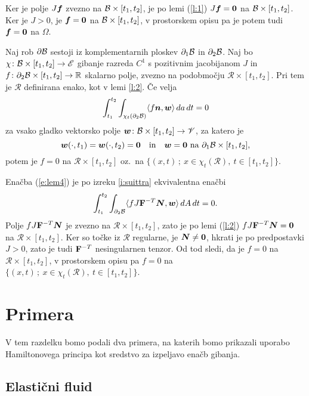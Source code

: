 	Ker je polje $J\boldsymbol f$ zvezno na $\mathcal B\times[t_1,t_2]$, je
	po lemi (\ref{l:1}) $J\boldsymbol f=\boldsymbol 0$
	na $\mathcal B\times[t_1,t_2]$. Ker je $J>0$, je $\boldsymbol f=\boldsymbol 0$ na $\mathcal B\times[t_1,t_2]$,
	v prostorskem opisu pa je potem tudi $\boldsymbol f=\boldsymbol 0$ na $\Omega$.
\endproof

\begin{lema} \label{lema4}
	Naj rob $\partial \mathcal B$ sestoji iz komplementarnih ploskev $\partial_1 \mathcal B$ in $\partial_2 \mathcal B$.
	Naj bo $\chi\colon \mathcal B\times[t_1,t_2]\to\mathscr E$ gibanje razreda $C^1$ s pozitivnim jacobijanom $J$ in
	$f\colon\partial_2 \mathcal B\times[t_1,t_2]\to\mathbb R$ skalarno polje, zvezno na podobmočju $\mathcal{R}\times[t_1,t_2]$.
	Pri tem je $\mathcal{R}$ definirana enako, kot v lemi \ref{l:2}. Če velja
	\begin{equation}\label{e:lem4}
		\int_{t_1}^{t_2}\int_{\chi_t(\partial_2 \mathcal B)}\langle f\boldsymbol n,\boldsymbol w\rangle\,da\,dt=0
	\end{equation}
	za vsako gladko vektorsko polje $\boldsymbol w\colon \mathcal B\times[t_1,t_2]\to\mathscr V$, za katero je
	\[
		\boldsymbol w(\cdot,t_1)=\boldsymbol w(\cdot,t_2)=\boldsymbol 0\quad\textrm{in}
		\quad\boldsymbol w=\boldsymbol 0\ \textrm{na}\ \partial_1 \mathcal B\times[t_1,t_2],
	\]
	potem je $f=0$ na $\mathcal{R}\times[t_1,t_2]$ oz.~na $\{(x,t)\,;\ x\in\chi_t(\mathcal{R}),\ t\in[t_1,t_2] \}$.
\end{lema}

\proof
	Enačba (\ref{e:lem4}) je po izreku \ref{i:suittra} ekvivalentna enačbi
	\[ \int_{t_1}^{t_2}\int_{\partial_2 \mathcal B}\langle fJ\mathbf F^{-T}\boldsymbol N,\boldsymbol w\rangle\,dA\,dt=0. \]
	Polje $fJ\mathbf F^{-T}\boldsymbol N$ je zvezno na $\mathcal{R}\times[t_1,t_2]$,
	zato je po lemi (\ref{l:2}) $fJ\mathbf F^{-T}\boldsymbol N=\boldsymbol 0$ na $\mathcal{R}\times[t_1,t_2]$.
	Ker so točke iz $\mathcal{R}$ regularne, je $\boldsymbol N\neq \boldsymbol 0$, hkrati je po predpostavki $J>0$,
	zato je tudi $\mathbf F^{-T}$ nesingularnen tenzor. Od tod sledi, da je $f=0$ na $\mathcal{R}\times[t_1,t_2]$,
	v prostorskem opisu pa $f=0$ na $\{(x,t)\,;\ x\in\chi_t(\mathcal{R}),\ t\in[t_1,t_2] \}$.
\endproof


\section{Primera} \label{sec:primeri}


V tem razdelku bomo podali dva primera, na katerih bomo prikazali uporabo Hamiltonovega principa
kot sredstvo za izpeljavo enačb gibanja.


\subsection{Elastični fluid}


